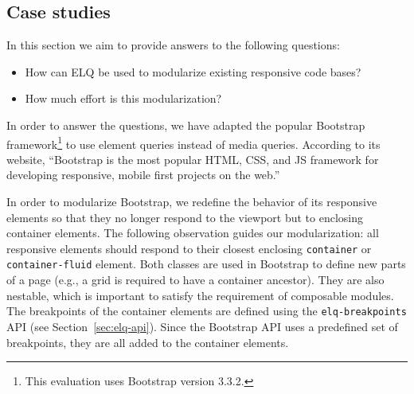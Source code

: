 \documentclass{acm_proc_article-sp}
\newcommand{\code}[1]{\texttt{#1}}
\newcommand{\elq}{ELQ}
\newcommand{\gls}[1]{#1}
\begin{document}

  \subsection{Case studies}
    In this section we aim to provide answers to the following questions:
    \begin{itemize}
      \item How can \elq{} be used to modularize existing responsive code bases?
      \item How much effort is this modularization?
    \end{itemize}

    In order to answer the questions, we have adapted the popular Bootstrap framework\footnote{This evaluation uses Bootstrap version 3.3.2.} to use element queries instead of media queries.
    According to its website, ``Bootstrap is the most popular HTML, CSS, and JS framework for developing responsive, mobile first projects on the web.''~\cite{bootstrap}
   
    In order to modularize Bootstrap, we redefine the behavior of its responsive elements so that they no longer respond to the viewport but to enclosing container elements.
    The following observation guides our modularization: all responsive elements should respond to their closest enclosing \code{container} or \code{container-fluid} element.
    Both classes are used in \gls{Bootstrap} to define new parts of a page (e.g., a grid is required to have a container ancestor).
    They are also nestable, which is important to satisfy the requirement of composable modules.
    The breakpoints of the container elements are defined using the \code{elq-breakpoints} API (see Section~\ref{sec:elq-api}).
    Since the Bootstrap API uses a predefined set of breakpoints, they are all added to the container elements.
\end{document}
